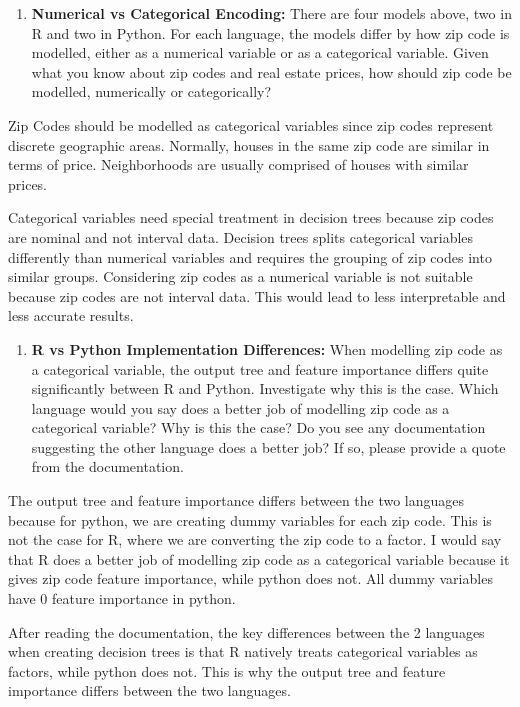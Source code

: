 \documentclass[
  letterpaper,
  DIV=11,
  numbers=noendperiod]{scrartcl}
\providecommand{\tightlist}{%
  \setlength{\itemsep}{0pt}\setlength{\parskip}{0pt}}
\begin{document}
\begin{enumerate}
\def\labelenumi{\arabic{enumi}.}
\tightlist
\item
  \textbf{Numerical vs Categorical Encoding:} There are four models
  above, two in R and two in Python. For each language, the models
  differ by how zip code is modelled, either as a numerical variable or
  as a categorical variable. Given what you know about zip codes and
  real estate prices, how should zip code be modelled, numerically or
  categorically?
\end{enumerate}

Zip Codes should be modelled as categorical variables since zip codes
represent discrete geographic areas. Normally, houses in the same zip
code are similar in terms of price. Neighborhoods are usually comprised
of houses with similar prices.

Categorical variables need special treatment in decision trees because
zip codes are nominal and not interval data. Decision trees splits
categorical variables differently than numerical variables and requires
the grouping of zip codes into similar groups. Considering zip codes as
a numerical variable is not suitable because zip codes are not interval
data. This would lead to less interpretable and less accurate results.

\begin{enumerate}
\def\labelenumi{\arabic{enumi}.}
\setcounter{enumi}{1}
\tightlist
\item
  \textbf{R vs Python Implementation Differences:} When modelling zip
  code as a categorical variable, the output tree and feature importance
  differs quite significantly between R and Python. Investigate why this
  is the case. Which language would you say does a better job of
  modelling zip code as a categorical variable? Why is this the case? Do
  you see any documentation suggesting the other language does a better
  job? If so, please provide a quote from the documentation.
\end{enumerate}

The output tree and feature importance differs between the two languages
because for python, we are creating dummy variables for each zip code.
This is not the case for R, where we are converting the zip code to a
factor. I would say that R does a better job of modelling zip code as a
categorical variable because it gives zip code feature importance, while
python does not. All dummy variables have 0 feature importance in
python.

After reading the documentation, the key differences between the 2
languages when creating decision trees is that R natively treats
categorical variables as factors, while python does not. This is why the
output tree and feature importance differs between the two languages.
\end{document}
